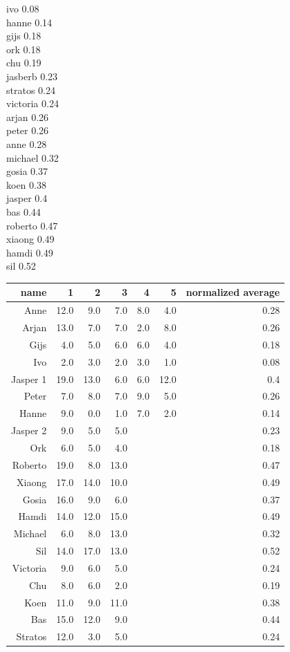 ivo 0.08\\
hanne 0.14\\
gijs 0.18\\
ork 0.18\\
chu 0.19\\
jasberb 0.23\\
stratos 0.24\\
victoria 0.24\\
arjan 0.26\\
peter 0.26\\
anne 0.28\\
michael 0.32\\
gosia 0.37\\
koen 0.38\\
jasper  0.4\\
bas 0.44\\
roberto 0.47\\
xiaong 0.49\\
hamdi 0.49\\
sil 0.52\\


\begin{tabular}{rrrrrrr}
\hline
name	& 1 & 2 & 3 & 4 & 5 & normalized average \\
\hline
Anne	&	12.0	&	9.0		&	7.0	&	8.0	&	4.0	&	0.28\\
Arjan	&	13.0	&	7.0		&	7.0	&	2.0	&	8.0	&	0.26\\
Gijs	&	4.0		&	5.0		&	6.0	&	6.0	&	4.0	&	0.18\\
Ivo		&	2.0		&	3.0		&	2.0	&	3.0	&	1.0	&	0.08\\
Jasper 1	&	19.0	&	13.0	&	6.0	&	6.0	&	12.0 &	0.4\\
Peter	&	7.0		&	8.0		&	7.0	&	9.0	&	5.0	&	0.26\\
Hanne	&	9.0		&	0.0		&	1.0	&	7.0	&	2.0	&	0.14\\
Jasper 2	&	9.0		&	5.0		&	5.0 & & & 0.23\\
Ork		&	6.0		&	5.0		&	4.0	& & & 0.18\\
Roberto	&	19.0	&	8.0		&	13.0 & & & 0.47\\
Xiaong	&	17.0	&	14.0	&	10.0 & & & 0.49\\
\hline
Gosia	&	16.0	&	9.0		&	6.0 & & & 0.37\\
Hamdi	&	14.0	&	12.0	&	15.0 & & & 0.49\\
Michael	&	6.0		&	8.0		&	13.0 & & & 0.32\\
Sil		&	14.0	&	17.0	&	13.0 & & & 0.52\\
Victoria	&	9.0	&	6.0		&	5.0 & & & 0.24\\
Chu		&	8.0		&	6.0		&	2.0 & & & 0.19\\
\hline
Koen	&	11.0	&	9.0		&	11.0 & & & 0.38\\
Bas		&	15.0	&	12.0	&	9.0 & & & 0.44\\
Stratos	&	12.0	&	3.0		&	5.0 & & & 0.24\\

\hline
\end{tabular}







